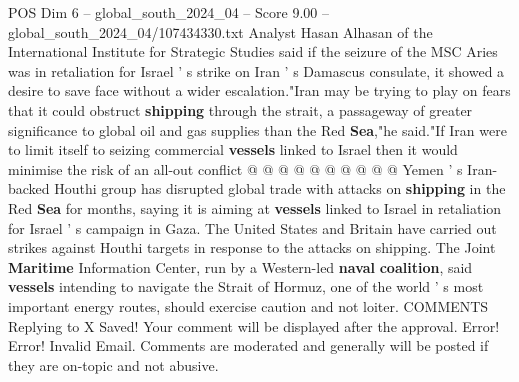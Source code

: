 \begin{textsample}{POS Dim 6 – global\_south\_2024\_04 – Score 9.00 – global\_south\_2024\_04/107434330.txt}
Analyst Hasan Alhasan of the International Institute for Strategic Studies said if the seizure of the MSC Aries was in retaliation for Israel ' s strike on Iran ' s Damascus consulate, it showed a desire to save face without a wider escalation."Iran may be trying to play on fears that it could obstruct \textbf{shipping} through the strait, a passageway of greater significance to global oil and gas supplies than the Red \textbf{Sea},"he said."If Iran were to limit itself to seizing commercial \textbf{vessels} linked to Israel then it would minimise the risk of an all-out conflict @ @ @ @ @ @ @ @ @ @ Yemen ' s Iran-backed Houthi group has disrupted global trade with attacks on \textbf{shipping} in the Red \textbf{Sea} for months, saying it is aiming at \textbf{vessels} linked to Israel in retaliation for Israel ' s campaign in Gaza.
The United States and Britain have carried out strikes against Houthi targets in response to the attacks on shipping.
The Joint \textbf{Maritime} Information Center, run by a Western-led \textbf{naval} \textbf{coalition}, said \textbf{vessels} intending to navigate the Strait of Hormuz, one of the world ' s most important energy routes, should exercise caution and not loiter.
COMMENTS Replying to X Saved!
Your comment will be displayed after the approval.
Error!
Error!
Invalid Email.
Comments are moderated and generally will be posted if they are on-topic and not abusive.

\end{textsample}
